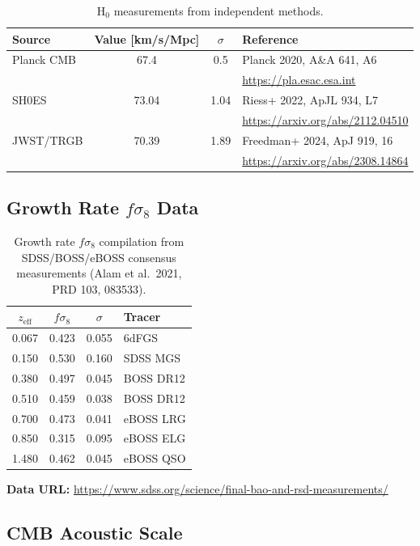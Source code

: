 \documentclass[11pt]{article}
\begin{document}
\begin{table}[h]
\centering
\begin{tabular}{lccp{5cm}}
\toprule
Source & Value [km/s/Mpc] & $\sigma$ & Reference \\
\midrule
Planck CMB & 67.4 & 0.5 & Planck 2020, A\&A 641, A6 \\
 & & & \url{https://pla.esac.esa.int} \\
\midrule
SH0ES & 73.04 & 1.04 & Riess+ 2022, ApJL 934, L7 \\
 & & & \url{https://arxiv.org/abs/2112.04510} \\
\midrule
JWST/TRGB & 70.39 & 1.89 & Freedman+ 2024, ApJ 919, 16 \\
 & & & \url{https://arxiv.org/abs/2308.14864} \\
\bottomrule
\end{tabular}
\caption{H$_0$ measurements from independent methods.}
\end{table}

\subsection{Growth Rate $f\sigma_8$ Data}

\begin{table}[h]
\centering
\begin{tabular}{cccp{4cm}}
\toprule
$z_{\text{eff}}$ & $f\sigma_8$ & $\sigma$ & Tracer \\
\midrule
0.067 & 0.423 & 0.055 & 6dFGS \\
0.150 & 0.530 & 0.160 & SDSS MGS \\
0.380 & 0.497 & 0.045 & BOSS DR12 \\
0.510 & 0.459 & 0.038 & BOSS DR12 \\
0.700 & 0.473 & 0.041 & eBOSS LRG \\
0.850 & 0.315 & 0.095 & eBOSS ELG \\
1.480 & 0.462 & 0.045 & eBOSS QSO \\
\bottomrule
\end{tabular}
\caption{Growth rate $f\sigma_8$ compilation from SDSS/BOSS/eBOSS consensus measurements (Alam et al.\ 2021, PRD 103, 083533).}
\end{table}

\noindent\textbf{Data URL:} \url{https://www.sdss.org/science/final-bao-and-rsd-measurements/}

\subsection{CMB Acoustic Scale}
\end{document}

